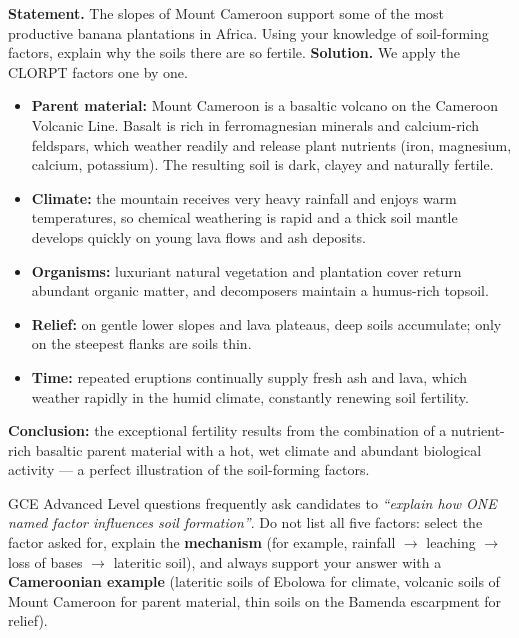 \documentclass[11pt]{article}
\begin{document}
\begin{exoresolu}
\textbf{Statement.} The slopes of Mount Cameroon support some of the most productive banana plantations in Africa. Using your knowledge of soil-forming factors, explain why the soils there are so fertile.
\tcblower
\textbf{Solution.} We apply the CLORPT factors one by one.
\begin{itemize}
\item \textbf{Parent material:} Mount Cameroon is a basaltic volcano on the Cameroon Volcanic Line. Basalt is rich in ferromagnesian minerals and calcium-rich feldspars, which weather readily and release plant nutrients (iron, magnesium, calcium, potassium). The resulting soil is dark, clayey and naturally fertile.
\item \textbf{Climate:} the mountain receives very heavy rainfall and enjoys warm temperatures, so chemical weathering is rapid and a thick soil mantle develops quickly on young lava flows and ash deposits.
\item \textbf{Organisms:} luxuriant natural vegetation and plantation cover return abundant organic matter, and decomposers maintain a humus-rich topsoil.
\item \textbf{Relief:} on gentle lower slopes and lava plateaus, deep soils accumulate; only on the steepest flanks are soils thin.
\item \textbf{Time:} repeated eruptions continually supply fresh ash and lava, which weather rapidly in the humid climate, constantly renewing soil fertility.
\end{itemize}
\textbf{Conclusion:} the exceptional fertility results from the combination of a nutrient-rich basaltic parent material with a hot, wet climate and abundant biological activity — a perfect illustration of the soil-forming factors.
\end{exoresolu}

\begin{attention}
GCE Advanced Level questions frequently ask candidates to \emph{``explain how ONE named factor influences soil formation''}. Do not list all five factors: select the factor asked for, explain the \textbf{mechanism} (for example, rainfall $\rightarrow$ leaching $\rightarrow$ loss of bases $\rightarrow$ lateritic soil), and always support your answer with a \textbf{Cameroonian example} (lateritic soils of Ebolowa for climate, volcanic soils of Mount Cameroon for parent material, thin soils on the Bamenda escarpment for relief).
\end{attention}
\end{document}
